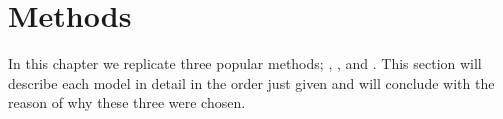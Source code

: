 \section{Methods}
\label{section:repro_methods}

In this chapter we replicate three popular methods; \cite{vo2015target}, \cite{wang-etal-2017-tdparse}, and \cite{tang-etal-2016-effective}. This section will describe each model in detail in the order just given and will conclude with the reason of why these three were chosen.

%
%





